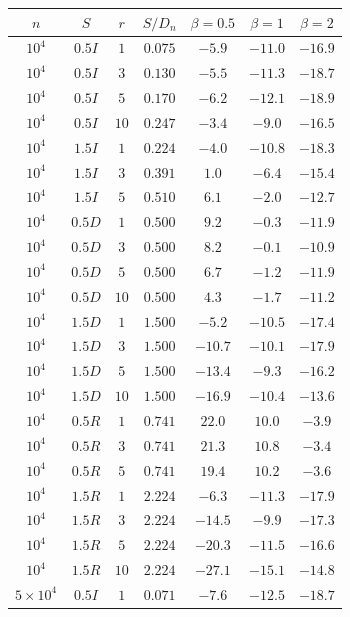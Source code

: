 \begin{table}[t]
\centering
\footnotesize
\begin{tabular}{ccccccc}
\toprule
$n$ & $S$ & $r$ & $S/D_n$ & $\beta{=}0.5$ & $\beta{=}1$ & $\beta{=}2$\\
\midrule
$10^4$ & $0.5I$ & $1$ & $0.075$ & $-5.9$ & $-11.0$ & $-16.9$\\
$10^4$ & $0.5I$ & $3$ & $0.130$ & $-5.5$ & $-11.3$ & $-18.7$\\
$10^4$ & $0.5I$ & $5$ & $0.170$ & $-6.2$ & $-12.1$ & $-18.9$\\
$10^4$ & $0.5I$ & $10$ & $0.247$ & $-3.4$ & $-9.0$ & $-16.5$\\
$10^4$ & $1.5I$ & $1$ & $0.224$ & $-4.0$ & $-10.8$ & $-18.3$\\
$10^4$ & $1.5I$ & $3$ & $0.391$ & $1.0$ & $-6.4$ & $-15.4$\\
$10^4$ & $1.5I$ & $5$ & $0.510$ & $6.1$ & $-2.0$ & $-12.7$\\
$10^4$ & $0.5D$ & $1$ & $0.500$ & $9.2$ & $-0.3$ & $-11.9$\\
$10^4$ & $0.5D$ & $3$ & $0.500$ & $8.2$ & $-0.1$ & $-10.9$\\
$10^4$ & $0.5D$ & $5$ & $0.500$ & $6.7$ & $-1.2$ & $-11.9$\\
$10^4$ & $0.5D$ & $10$ & $0.500$ & $4.3$ & $-1.7$ & $-11.2$\\
$10^4$ & $1.5D$ & $1$ & $1.500$ & $-5.2$ & $-10.5$ & $-17.4$\\
$10^4$ & $1.5D$ & $3$ & $1.500$ & $-10.7$ & $-10.1$ & $-17.9$\\
$10^4$ & $1.5D$ & $5$ & $1.500$ & $-13.4$ & $-9.3$ & $-16.2$\\
$10^4$ & $1.5D$ & $10$ & $1.500$ & $-16.9$ & $-10.4$ & $-13.6$\\
$10^4$ & $0.5R$ & $1$ & $0.741$ & $22.0$ & $10.0$ & $-3.9$\\
$10^4$ & $0.5R$ & $3$ & $0.741$ & $21.3$ & $10.8$ & $-3.4$\\
$10^4$ & $0.5R$ & $5$ & $0.741$ & $19.4$ & $10.2$ & $-3.6$\\
$10^4$ & $1.5R$ & $1$ & $2.224$ & $-6.3$ & $-11.3$ & $-17.9$\\
$10^4$ & $1.5R$ & $3$ & $2.224$ & $-14.5$ & $-9.9$ & $-17.3$\\
$10^4$ & $1.5R$ & $5$ & $2.224$ & $-20.3$ & $-11.5$ & $-16.6$\\
$10^4$ & $1.5R$ & $10$ & $2.224$ & $-27.1$ & $-15.1$ & $-14.8$\\
\midrule
$5{\times}10^4$ & $0.5I$ & $1$ & $0.071$ & $-7.6$ & $-12.5$ & $-18.7$\\

\end{tabular}
\end{table}
